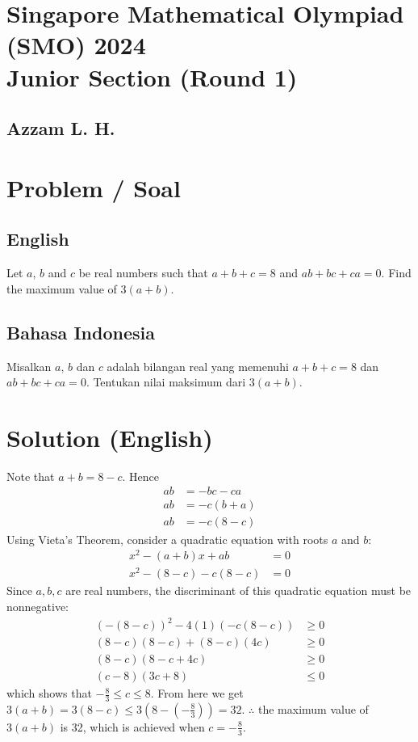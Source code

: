 \section*{Singapore Mathematical Olympiad (SMO) 2024\\Junior Section (Round 1)}
\subsection*{Azzam L. H.}

\section{Problem / Soal}
\subsection*{English}
Let $a$, $b$ and $c$ be real numbers such that $a + b + c = 8$ and $ab + bc + ca = 0$.
Find the maximum value of $3(a + b)$.

\subsection*{Bahasa Indonesia}
Misalkan $a$, $b$ dan $c$ adalah bilangan real yang memenuhi $a + b + c = 8$ dan $ab + bc + ca = 0$.
Tentukan nilai maksimum dari $3(a + b)$.

\newpage
\renewcommand*\contentsname{Daftar Isi / Content}
\tableofcontents

\newpage
\section{Solution (English)}
Note that $a+b = 8-c$. Hence
\begin{align*}
    ab &= -bc-ca\\
    ab &= -c(b+a)\\
    ab &= -c(8-c)
\end{align*}
Using Vieta's Theorem, consider a quadratic equation with roots $a$ and $b$:
\begin{align*}
    x^2 - (a+b)x + ab &= 0\\
    x^2 - (8-c) - c(8-c) &= 0
\end{align*}
Since $a,b,c$ are real numbers, the discriminant of this quadratic equation must be nonnegative:
\begin{align*}
    (-(8-c))^2 - 4(1)(-c(8-c)) &\ge 0\\
    (8-c)(8-c) + (8-c)(4c) &\ge 0\\
    (8-c)(8-c+4c) &\ge 0\\
    (c-8)(3c+8) &\le 0
\end{align*}
which shows that $-\frac{8}{3} \le c \le 8$.
From here we get $3(a+b) = 3(8-c) \le 3(8-(-\frac{8}{3})) = 32$.
$\therefore$ the maximum value of $3(a + b)$ is 32, which is achieved when $c=-\frac{8}{3}$.


